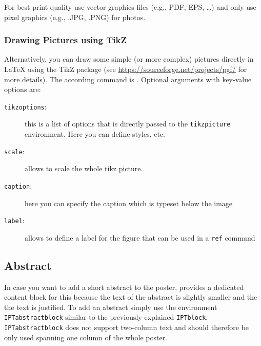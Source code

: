 For best print quality use vector graphics files (e.g., PDF, EPS, \ldots) and only use pixel graphics (e.g., .JPG, .PNG) for photos.



\subsubsection{Drawing Pictures using TikZ}

Alternatively, you can draw some simple (or more complex) pictures directly in \LaTeX{} using the TikZ package (see \url{https://sourceforge.net/projects/pgf/} for more details). The according command is \texttt{}. Optional arguments with key-value options are:

\begin{description}
	\item[\texttt{tikzoptions}:] this is a list of options that is directly passed to the \texttt{tikzpicture} environment. Here you can define styles, etc.
	\item[\texttt{scale}:] allows to scale the whole tikz picture.
	\item[\texttt{caption}:] here you can specify the caption which is typeset below the image
	\item[\texttt{label}:] allows to define a label for the figure that can be used in a \texttt{\bs{}ref} command
\end{description}



\subsection{Abstract}

In case you want to add a short abstract to the poster, \tugPoster{} provides a dedicated content block for this because the text of the abstract is slightly smaller and the the text is justified. To add an abstract simply use the environment \texttt{IPTabstractblock} similar to the previously explained \texttt{IPTblock}. \texttt{IPTabstractblock} does not support two-column text and should therefore be only used spanning one column of the whole poster.

